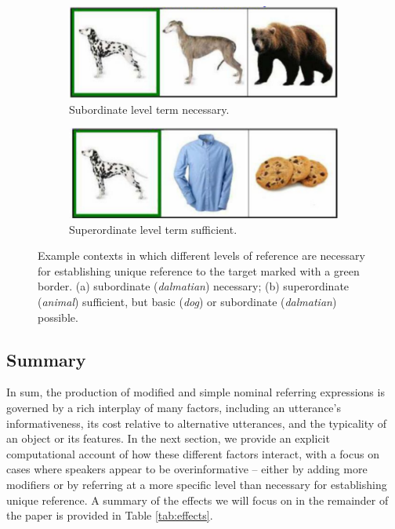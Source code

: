 \documentclass[11pt]{article}
\newcommand{\tableref}[1]{Table \ref{#1}}
\begin{document}
\begin{figure}
\begin{subfigure}{.5\textwidth}
\includegraphics[width=\textwidth]{pics/dog-subnecessary}
\caption{Subordinate level term necessary.}
\label{fig:subnecessary}
\end{subfigure}
\begin{subfigure}{.5\textwidth}
\includegraphics[width=\textwidth]{pics/dog-supersufficient}
\caption{Superordinate level term sufficient.}
\label{fig:supersufficient}
\end{subfigure}
\caption{Example contexts in which different levels of reference are necessary for establishing unique reference to the target marked with a green border. (a) subordinate (\emph{dalmatian}) necessary; (b) superordinate (\emph{animal}) sufficient, but basic  (\emph{dog}) or subordinate (\emph{dalmatian}) possible.}
\label{fig:dogexamples}
\end{figure}

\subsection{Summary}
\label{sec:introsummary}

In sum, the production of modified and simple nominal referring expressions is governed by a rich interplay of many factors, including an utterance's informativeness, its cost relative to alternative utterances, and the typicality of an object or its features. In the next section, we provide an explicit computational account of how these different factors interact, with a focus on cases where speakers appear to be overinformative -- either by adding more modifiers or by referring at a more specific level than necessary for establishing unique reference. A summary of the effects we will focus on in the remainder of the paper is provided in \tableref{tab:effects}.
\end{document}
